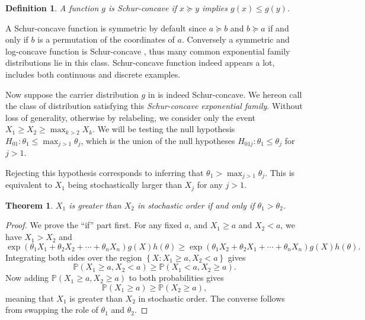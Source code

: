 \documentclass[11pt]{article}
\newtheorem{definition}{Definition}
\newtheorem{theorem}{Theorem}
\newcommand{\PP}{\mathbb{P}}
\begin{document}
\begin{definition}
A function $g$ is Schur-concave if $x \succeq y$ implies $g\left(x\right) \le g\left(y\right)$.
\end{definition}

A Schur-concave function is symmetric by default since $a \succeq b$ and $b \succeq a$ if and only if $b$ is a permutation of the coordinates of $a$. Conversely a symmetric and log-concave function is Schur-concave \cite{Marshall:2010hb}, thus many common exponential family distributions lie in this class. Schur-concave function indeed appears a lot,  includes both continuous and discrete examples.

Now suppose the carrier distribution $g$ in  is indeed Schur-concave. We hereon call the class of distribution satisfying this {\em Schur-concave exponential family}. Without loss of generality, otherwise by relabeling, we consider only the event $X_1 \ge X_2 \ge \max_{k > 2} X_k$. We will be testing the null hypothesis $H_{01}: \theta_1 \le \max_{j > 1} \theta_j$, which is the union of the null hypotheses $H_{01j}: \theta_1 \le \theta_j$ for $j > 1$.

Rejecting this hypothesis corresponds to inferring that $\theta_1 > \max_{j>1} \theta_j$. This is equivalent to $X_1$ being stochastically larger than $X_j$ for any $j > 1$.

\begin{theorem}
\label{thm:stoch}
$X_1$ is greater than $X_2$ in stochastic order if and only if $\theta_1 > \theta_2$.
\end{theorem}

\begin{proof}

We prove the ``if'' part first. For any fixed $a$, and $X_1 \ge a$ and $X_2 < a$, we have $X_1 > X_2$ and
$$\exp\left(\theta_1 X_1 + \theta_2 X_2 + \cdots + \theta_n X_n\right) g\left(X\right) h\left(\theta\right) \ge \exp\left(\theta_1 X_2 + \theta_2 X_1 + \cdots + \theta_n X_n\right) g\left(X\right) h\left(\theta\right).$$
Integrating both sides over the region $\left\{X: X_1 \ge a, X_2 < a\right\}$ gives
$$\PP\left(X_1 \ge a, X_2 < a\right) \ge \PP\left(X_1 < a, X_2 \ge a\right).$$
Now adding $\PP\left(X_1 \ge a, X_2 \ge a\right)$ to both probabilities gives
$$\PP\left(X_1 \ge a\right) \ge \PP\left(X_2 \ge a\right),$$
meaning that $X_1$ is greater than $X_2$ in stochastic order. The converse follows from swapping the role of $\theta_1$ and $\theta_2$.

\end{proof}
\end{document}
